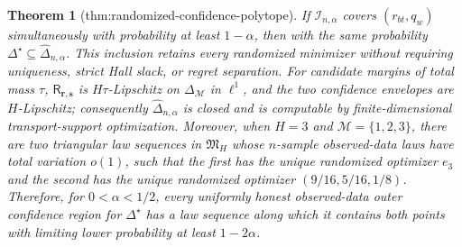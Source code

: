 \documentclass{article}
\newtheorem{theorem}{Theorem}
\begin{document}
\begin{theorem}[thm:randomized-confidence-polytope]\label{thm:randomized-confidence-polytope}
If \(\mathcal I_{n,\alpha}\) covers \((r_{bt},q_w)\) simultaneously with probability at least \(1-\alpha\), then with the same probability \(\Delta^\star\subseteq\widehat{\Delta}_{n,\alpha}\).  This inclusion retains every randomized minimizer without requiring uniqueness, strict Hall slack, or regret separation.  For candidate margins of total mass \(\tau\), \(\mathsf R_{\mathbf r,\mathbf s}\) is \(H\tau\)-Lipschitz on \(\Delta_{\mathcal M}\) in \(\ell^1\), and the two confidence envelopes are \(H\)-Lipschitz; consequently \(\widehat{\Delta}_{n,\alpha}\) is closed and is computable by finite-dimensional transport-support optimization.  Moreover, when \(H=3\) and \(\mathcal M=\{1,2,3\}\), there are two triangular law sequences in \(\mathfrak M_H\) whose \(n\)-sample observed-data laws have total variation \(o(1)\), such that the first has the unique randomized optimizer \(e_3\) and the second has the unique randomized optimizer \((9/16,5/16,1/8)\).  Therefore, for \(0<\alpha<1/2\), every uniformly honest observed-data outer confidence region for \(\Delta^\star\) has a law sequence along which it contains both points with limiting lower probability at least \(1-2\alpha\).
\end{theorem}
\end{document}
